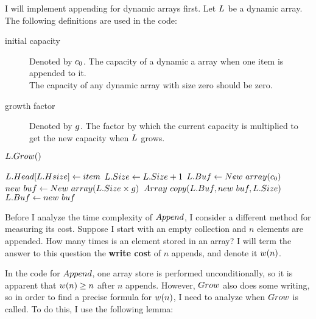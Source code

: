\HdrDynArrayImpl

I will implement appending for dynamic arrays first. Let $L$ be a dynamic array. The following definitions are used in the code:

\begin{description}
	\item[initial capacity] Denoted by $c_0$. The capacity of a dynamic a array when one item is appended to it.\\
	{\HdrNote} The capacity of any dynamic array with size zero should be zero.
	\item[growth factor] Denoted by $g$. The factor by which the current capacity is multiplied to get the new capacity when $L$ grows.
\end{description}

\begin{algorithm}
	\begin{algorithmic}[1]
				\State $L.Grow()$
			\EndIf
			
			\State $L.Head[L.Hsize] \gets item$
			\State $L.Size \gets L.Size + 1$
		\EndProcedure
		\Statex
				\State $L.Buf \gets New\ array(c_0)$
			\Else
				\State $new\ buf \gets \FuncNewArray(\VarList.\FieldSize \times \VarGrowthFactor)$
				\State $Array\ copy(L.Buf, new\ buf, L.Size)$
				\State $L.Buf \gets new\ buf$
			\EndIf
		\EndProcedure
	\end{algorithmic}
\end{algorithm}

\HdrTimeComplex

Before I analyze the time complexity of $Append$, I consider a different method for measuring its cost. Suppose I start with an empty collection and $n$ elements are appended. How many times is an element stored in an array? I will term the answer to this question the \textbf{write cost} of $n$ appends, and denote it $w(n)$.

In the code for $Append$, one array store is performed unconditionally, so it is apparent that $w(n) \geq n$ after $n$ appends. However, $Grow$ also does some writing, so in order to find a precise formula for $w(n)$, I need to analyze when $Grow$ is called. To do this, I use the following lemma:


